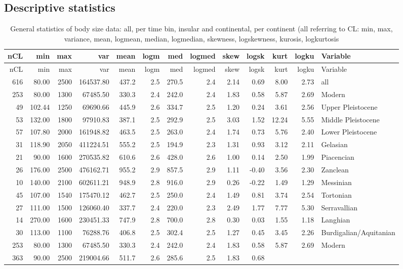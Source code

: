 \documentclass[]{article}
\begin{document}
\newpage

\subsection{Descriptive statistics}\label{descriptive-statistics}

\begin{longtable}[]{@{}rrrrrrrrrrrrl@{}}
\caption{General statistics of body size data: all, per time bin,
insular and continental, per continent (all referring to CL: min, max,
variance, mean, logmean, median, logmedian, skewness, logskewness,
kurosis, logkurtosis}\tabularnewline
\toprule
nCL & min & max & var & mean & logm & med & logmed & skew & logsk & kurt
& logku & Variable\tabularnewline
\midrule
\endfirsthead
\toprule
nCL & min & max & var & mean & logm & med & logmed & skew & logsk & kurt
& logku & Variable\tabularnewline
\midrule
\endhead
616 & 80.00 & 2500 & 164537.80 & 437.2 & 2.5 & 270.5 & 2.4 & 2.14 & 0.69
& 8.00 & 2.73 & all\tabularnewline
253 & 80.00 & 1300 & 67485.50 & 330.3 & 2.4 & 242.0 & 2.4 & 1.83 & 0.58
& 5.87 & 2.69 & Modern\tabularnewline
49 & 102.44 & 1250 & 69690.66 & 445.9 & 2.6 & 334.7 & 2.5 & 1.20 & 0.24
& 3.61 & 2.56 & Upper Pleistocene\tabularnewline
53 & 132.00 & 1800 & 97910.83 & 387.1 & 2.5 & 292.9 & 2.5 & 3.03 & 1.52
& 12.24 & 5.55 & Middle Pleistocene\tabularnewline
57 & 107.80 & 2000 & 161948.82 & 463.5 & 2.5 & 263.0 & 2.4 & 1.74 & 0.73
& 5.76 & 2.40 & Lower Pleistocene\tabularnewline
31 & 118.90 & 2050 & 411224.51 & 555.2 & 2.5 & 194.9 & 2.3 & 1.31 & 0.93
& 3.12 & 2.11 & Gelasian\tabularnewline
21 & 90.00 & 1600 & 270535.82 & 610.6 & 2.6 & 428.0 & 2.6 & 1.00 & 0.14
& 2.50 & 1.99 & Piacencian\tabularnewline
26 & 176.00 & 2500 & 476162.71 & 955.2 & 2.9 & 857.5 & 2.9 & 1.11 &
-0.40 & 3.56 & 2.30 & Zanclean\tabularnewline
10 & 140.00 & 2100 & 602611.21 & 948.9 & 2.8 & 916.0 & 2.9 & 0.26 &
-0.22 & 1.49 & 1.29 & Messinian\tabularnewline
45 & 107.00 & 1540 & 175470.12 & 462.7 & 2.5 & 250.0 & 2.4 & 1.49 & 0.81
& 3.74 & 2.54 & Tortonian\tabularnewline
27 & 111.00 & 1500 & 126060.40 & 337.7 & 2.4 & 220.0 & 2.3 & 2.49 & 1.77
& 7.77 & 5.30 & Serravallian\tabularnewline
14 & 270.00 & 1600 & 230451.33 & 747.9 & 2.8 & 700.0 & 2.8 & 0.30 & 0.03
& 1.55 & 1.18 & Langhian\tabularnewline
30 & 113.00 & 1100 & 76288.76 & 406.8 & 2.5 & 302.4 & 2.5 & 1.27 & 0.45
& 3.45 & 2.26 & Burdigalian/Aquitanian\tabularnewline
253 & 80.00 & 1300 & 67485.50 & 330.3 & 2.4 & 242.0 & 2.4 & 1.83 & 0.58
& 5.87 & 2.69 & Modern\tabularnewline
363 & 90.00 & 2500 & 219004.66 & 511.7 & 2.6 & 285.6 & 2.5 & 1.83 & 0.68

\end{longtable}
\end{document}
